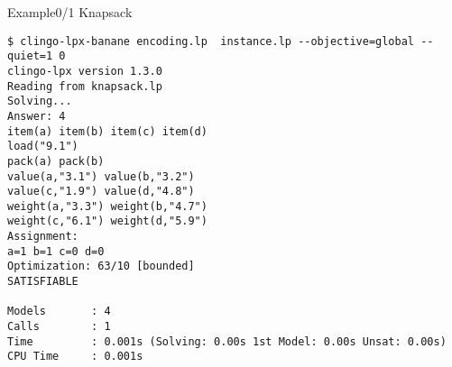 \begin{frame}[fragile]{Example}{0/1 Knapsack}
\begin{adjustbox}{max totalsize={\textwidth}{.75\textheight},keepaspectratio}
\begin{lstlisting}
$ clingo-lpx-banane encoding.lp  instance.lp --objective=global --quiet=1 0
clingo-lpx version 1.3.0
Reading from knapsack.lp
Solving...
Answer: 4
item(a) item(b) item(c) item(d)
load("9.1")
pack(a) pack(b)
value(a,"3.1") value(b,"3.2")
value(c,"1.9") value(d,"4.8")
weight(a,"3.3") weight(b,"4.7")
weight(c,"6.1") weight(d,"5.9")
Assignment:
a=1 b=1 c=0 d=0
Optimization: 63/10 [bounded]
SATISFIABLE

Models       : 4
Calls        : 1
Time         : 0.001s (Solving: 0.00s 1st Model: 0.00s Unsat: 0.00s)
CPU Time     : 0.001s
\end{lstlisting}
\end{adjustbox}
\end{frame}

